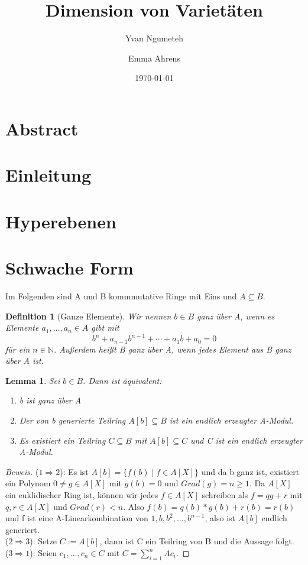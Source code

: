 \documentclass{article}
\title{Dimension von Varietäten}
\date{\today}
\author{Yvan Ngumeteh \and Emma Ahrens}
\newtheorem{definition}[satz]{Definition}
\newtheorem{lemma}[satz]{Lemma}
\begin{document}
\maketitle

\section{Abstract}
\section{Einleitung}
\section{Hyperebenen}
\section{Schwache Form}

	Im Folgenden sind A und B kommmutative Ringe mit Eins und \(A \subseteq B\).

	\begin{definition}[Ganze Elemente]
	Wir nennen \(b \in B\) ganz über A, wenn es Elemente \(a_1, \ldots, a_n \in
	A\) gibt mit
	\begin{displaymath} b^n + a_{n-1}b^{n-1} + \cdots + a_1b + a_0 = 0
	\end{displaymath} für ein \(n \in \mathbb{N}\).
	Außerdem heißt B ganz über A, wenn jedes Element aus B ganz über A ist.
	\end{definition}

	\begin{lemma}
	Sei \(b \in B\). Dann ist äquivalent:
	\begin{enumerate}
	\item b ist ganz über A
	\item Der von b generierte Teilring \(A[b] \subseteq B\) ist ein endlich
	erzeugter A-Modul.
	\item Es existiert ein Teilring \(C \subseteq B\) mit \(A[b] \subseteq C\)
	und C ist ein endlich erzeugter A-Modul.
	\end{enumerate}
	\end{lemma}

	\begin{proof}[Beweis]
	(\(1 \Rightarrow 2\)): Es ist \(A[b] = \{f(b)\;|\;f\in A[X]\}\)
	und da b ganz ist, existiert ein Polynom \(0 \neq g \in A[X]\) mit \(g(b) 
	= 0\) und \(Grad(g) = n \geq 1\). Da \(A[X]\) ein euklidischer Ring ist, können
	wir jedes \(f \in A[X]\) schreiben als \(f = qg + r\) mit \(q,r \in A[X]\)
	und \(Grad(r) < n\). Also \(f(b) = q(b)*g(b) + r(b) = r(b)\) und f ist eine
	A-Linearkombination von \(1, b, b^2, \ldots, b^{n-1}\), also ist \(A[b]\)
	endlich generiert. \\
	(\(2 \Rightarrow 3\)): Setze \(C := A[b]\), dann ist C ein Teilring von B
	und die Aussage folgt. \\
	(\(3 \Rightarrow 1\)): Seien \(c_1, \ldots, c_n \in C\) mit \(C =
	\sum_{i=1}^n Ac_i\). 
	\end{proof}
\end{document}

